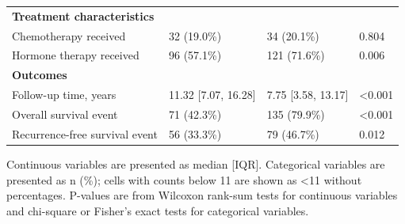 \begin{table}[!htbp]
\begin{tabular}{llll}
\midrule
\multicolumn{4}{l}{\textbf{Treatment characteristics}} \\
Chemotherapy received & 32 (19.0\%) & 34 (20.1\%) & 0.804 \\
Hormone therapy received & 96 (57.1\%) & 121 (71.6\%) & 0.006 \\
\midrule
\multicolumn{4}{l}{\textbf{Outcomes}} \\
Follow-up time, years & 11.32 [7.07, 16.28] & 7.75 [3.58, 13.17] & \textless{}0.001 \\
Overall survival event & 71 (42.3\%) & 135 (79.9\%) & \textless{}0.001 \\
Recurrence-free survival event & 56 (33.3\%) & 79 (46.7\%) & 0.012 \\
\bottomrule
\end{tabular}
\begin{minipage}{0.95\linewidth}
\vspace{0.5em}
\footnotesize Continuous variables are presented as median [IQR]. Categorical variables are presented as n (\%); cells with counts below 11 are shown as <11 without percentages. P-values are from Wilcoxon rank-sum tests for continuous variables and chi-square or Fisher's exact tests for categorical variables.
\end{minipage}
\end{table}
